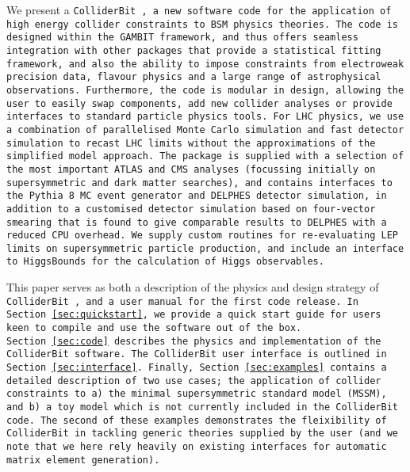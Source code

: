 We present a \tt ColliderBit \rm, a new software code for the application of high energy collider constraints to BSM physics theories. The code is designed within the \tt GAMBIT \rm framework, and thus offers seamless integration with other packages that provide a statistical fitting framework, and also the ability to impose constraints from electroweak precision data, flavour physics and a large range of astrophysical observations. Furthermore, the code is modular in design, allowing the user to easily swap components, add new collider analyses or provide interfaces to standard particle physics tools. For LHC physics, we use a combination of parallelised Monte Carlo simulation and fast detector simulation to recast LHC limits without the approximations of the simplified model approach. The package is supplied with a selection of the most important ATLAS and CMS analyses (focussing initially on supersymmetric and dark matter searches), and contains interfaces to the \tt Pythia 8 \rm MC event generator and \tt DELPHES \rm detector simulation, in addition to a customised detector simulation based on four-vector smearing that is found to give comparable results to \tt DELPHES \rm with a reduced CPU overhead. We supply custom routines for re-evaluating LEP limits on supersymmetric particle production, and include an interface to \tt HiggsBounds \rm for the calculation of Higgs observables.

This paper serves as both a description of the physics and design strategy of \tt ColliderBit \rm, and a user manual for the first code release. In Section~\ref{sec:quickstart}, we provide a quick start guide for users keen to compile and use the software out of the box. Section~\ref{sec:code} describes the physics and implementation of the ColliderBit software. The \tt ColliderBit \rm user interface is outlined in Section~\ref{sec:interface}. Finally, Section~\ref{sec:examples} contains a detailed description of two use cases; the application of collider constraints to a) the minimal supersymmetric standard model (MSSM), and b) a toy model which is not currently included in the \tt ColliderBit code\rm. The second of these examples demonstrates the fleixibility of \tt ColliderBit \rm in tackling generic theories supplied by the user (and we note that we here rely heavily on existing interfaces for automatic matrix element generation).

